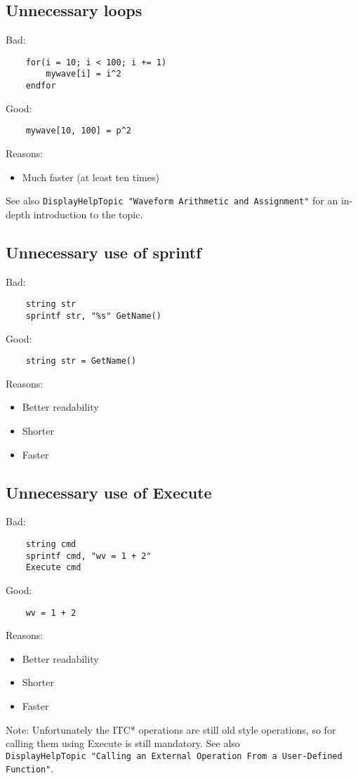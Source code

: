 \documentclass{scrartcl}
\begin{document}
\subsection{Unnecessary loops}
Bad:
\begin{verbatim}
	for(i = 10; i < 100; i += 1)
		mywave[i] = i^2
	endfor
\end{verbatim}
Good:
\begin{verbatim}
	mywave[10, 100] = p^2
\end{verbatim}
Reasons:
\begin{itemize}
	\item Much faster (at least ten times)
\end{itemize}
See also \texttt{DisplayHelpTopic "Waveform Arithmetic and Assignment"} for an in-depth introduction to the topic.
%
\subsection{Unnecessary use of sprintf}
Bad:
\begin{verbatim}
	string str
	sprintf str, "%s" GetName()	
\end{verbatim}
Good:
\begin{verbatim}
	string str = GetName()
\end{verbatim}
Reasons:
\begin{itemize}
  \item Better readability
  \item Shorter
  \item Faster
\end{itemize}
% 
\subsection{Unnecessary use of Execute}
Bad:
\begin{verbatim}
	string cmd
	sprintf cmd, "wv = 1 + 2"
	Execute cmd
\end{verbatim}
Good:
\begin{verbatim}
	wv = 1 + 2
\end{verbatim}
\pagebreak
Reasons:
\begin{itemize}
  \item Better readability
  \item Shorter
  \item Faster
\end{itemize}
% 
Note: Unfortunately the ITC* operations are still old style operations, so for calling them using Execute is still mandatory. See also \\
\texttt{DisplayHelpTopic "Calling an External Operation From a User-Defined Function"}.
% 
\end{document}
